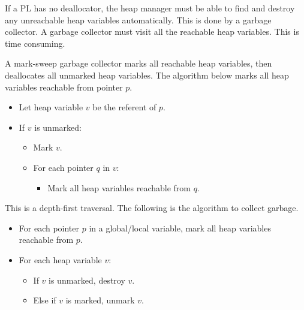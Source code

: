 \documentclass[a4paper, openany]{memoir}
\begin{document}
If a PL has no deallocator, the heap manager must be able to find and destroy any unreachable heap variables automatically. This is done by a garbage collector. A garbage collector must visit all the reachable heap variables. This is time consuming. 

A mark-sweep garbage collector marks all reachable heap variables, then deallocates all unmarked heap variables. The algorithm below marks all heap variables reachable from pointer $p$.
\begin{itemize}
    \item Let heap variable $v$ be the referent of $p$.
    \item If $v$ is unmarked:
    \begin{itemize}
        \item Mark $v$.
        \item For each pointer $q$ in $v$:
        \begin{itemize}
            \item Mark all heap variables reachable from $q$.
        \end{itemize}
    \end{itemize}
\end{itemize}
This is a depth-first traversal. The following is the algorithm to collect garbage.
\begin{itemize}
    \item For each pointer $p$ in a global/local variable, mark all heap variables reachable from $p$.
    \item For each heap variable $v$:
    \begin{itemize}
        \item If $v$ is unmarked, destroy $v$.
        \item Else if $v$ is marked, unmark $v$.
    \end{itemize}
\end{itemize}
\end{document}
